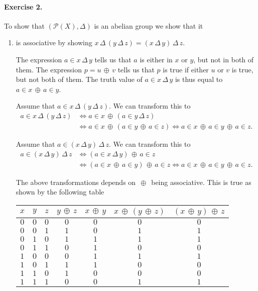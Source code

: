 \documentclass{article}
\newcommand{\Deltaop}{\, \Delta\, }
\newcommand{\xor}{\, \oplus\, }
\begin{document}
\paragraph{Exercise 2.} To show that $(\mathcal{P}(X), \Delta)$ is an abelian group we show that it
\begin{enumerate}
    \item is associative by showing $x \Deltaop (y \Deltaop z) = (x \Deltaop y) \Deltaop z$.
    
    The expression $a \in x \Deltaop y$ tells us that $a$ is either in $x$ or $y$, but not in both of them. The expression $p = u \xor v$ tells us that $p$ is true if either $u$ or $v$ is true, but not both of them. The truth value of $a \in x \Deltaop y$ is thus equal to $a \in x \xor a \in y$.

    Assume that $a \in x \Deltaop (y \Deltaop z)$. We can transform this to
    \begin{align*}
        a \in x \Deltaop (y \Deltaop z) &\Longleftrightarrow a \in x \xor (a \in y \Deltaop z) \\
        &\Longleftrightarrow a \in x \xor (a \in y \xor a \in z) \Longleftrightarrow a \in x \xor a \in y \xor a \in z.
    \end{align*}
    
    Assume that $a \in (x \Deltaop y) \Deltaop z$. We can transform this to
    \begin{align*}
        a \in (x \Deltaop y) \Deltaop z &\Longleftrightarrow (a \in x \Deltaop y) \xor  a \in z \\
        &\Longleftrightarrow (a \in x \xor a \in y) \xor a \in z \Longleftrightarrow a \in x \xor a \in y \xor a \in z.
    \end{align*}

    The above transformations depends on $\xor$ being associative. This is true as shown by the following table
    \begin{center}
        \begin{tabular}{c c c | c c c c}
            $x$ & $y$ & $z$ & $y \xor z$ & $x \xor y$ & $x \xor (y \xor z)$ & $(x \xor y) \xor z$ \\\midrule
            $0$ & $0$ & $0$ & $0$ & $0$ & $0$ & $0$ \\
            $0$ & $0$ & $1$ & $1$ & $0$ & $1$ & $1$ \\
            $0$ & $1$ & $0$ & $1$ & $1$ & $1$ & $1$ \\
            $0$ & $1$ & $1$ & $0$ & $1$ & $0$ & $0$ \\
            $1$ & $0$ & $0$ & $0$ & $1$ & $1$ & $1$ \\
            $1$ & $0$ & $1$ & $1$ & $1$ & $0$ & $0$ \\
            $1$ & $1$ & $0$ & $1$ & $0$ & $0$ & $0$ \\
            $1$ & $1$ & $1$ & $0$ & $0$ & $1$ & $1$ \\
        \end{tabular}
    \end{center}


\end{enumerate}
\end{document}
